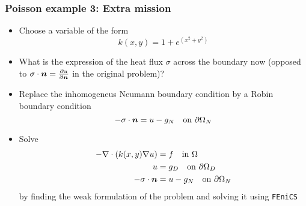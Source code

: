 \begin{frame}
    \frametitle{Poisson example 3: Extra mission}
    \begin{itemize}
        \item Choose a variable  of the form
            \begin{equation*}
                k(x,y) = 1 + e^{(x^2 + y^2)}
            \end{equation*}
        \item What is the expression of the heat flux $\sigma$ across the
            boundary now (opposed to 
            $\sigma  \cdot \boldsymbol{n} = \tfrac{\partial u}{\partial \boldsymbol{n}}$ in the
            original problem)? 
        \item Replace the inhomogeneus Neumann boundary condition by a
            Robin boundary condition
            \begin{equation*}
                -\sigma \cdot \boldsymbol{n} = u - g_N \quad \text{on } \partial
                \Omega_N
            \end{equation*}
        \item
            Solve
            \vspace{-2em}
            \begin{align*}
                -\nabla \cdot (k(x,y) \nabla u ) &= f \quad \text{in } \Omega \\
                                               u &= g_D \quad \text{on } \partial \Omega_D \\
                               -\sigma \cdot \boldsymbol{n} &= u - g_N \quad \text{on }
                \partial \Omega_N
            \end{align*}
            by finding the weak formulation of the problem and solving it
            using \texttt{FEniCS}
    \end{itemize}
\end{frame}
